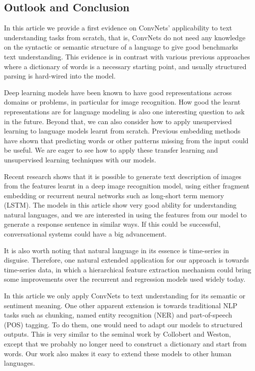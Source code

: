 \documentclass{article}
\begin{document}
\begin{CJK}{UTF8}{gbsn}
\section{Outlook and Conclusion}

In this article we provide a first evidence on ConvNets' applicability to text understanding tasks from scratch, that is, ConvNets do not need any knowledge on the syntactic or semantic structure of a language to give good benchmarks text understanding. This evidence is in contrast with various previous approaches where a dictionary of words is a necessary starting point, and usually structured parsing is hard-wired into the model\cite{CWB11}\cite{K14}\cite{JZ14}\cite{SG14}.

Deep learning models have been known to have good representations across domains or problems, in particular for image recognition\cite{RASC14}. How good the learnt representations are for language modeling is also one interesting question to ask in the future. Beyond that, we can also consider how to apply unsupervised learning to language models learnt from scratch. Previous embedding methods\cite{CWB11}\cite{MSCCD13}\cite{LM14} have shown that predicting words or other patterns missing from the input could be useful. We are eager to see how to apply these transfer learning and unsupervised learning techniques with our models.

Recent research shows that it is possible to generate text description of images from the features learnt in a deep image recognition model, using either fragment embedding\cite{KJF14} or recurrent neural networks such as long-short term memory (LSTM)\cite{VTBE14}. The models in this article show very good ability for understanding natural languages, and we are interested in using the features from our model to generate a response sentence in similar ways. If this could be successful, conversational systems could have a big advancement.

It is also worth noting that natural language in its essence is time-series in disguise. Therefore, one natural extended application for our approach is towards time-series data, in which a hierarchical feature extraction mechanism could bring some improvements over the recurrent and regression models used widely today.

In this article we only apply ConvNets to text understanding for its semantic or sentiment meaning. One other apparent extension is towards traditional NLP tasks such as chunking, named entity recognition (NER) and part-of-speech (POS) tagging. To do them, one would need to adapt our models to structured outputs. This is very similar to the seminal work by Collobert and Weston\cite{CWB11}, except that we probably no longer need to construct a dictionary and start from words. Our work also makes it easy to extend these models to other human languages.


\end{CJK}
\end{document}
